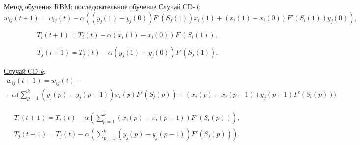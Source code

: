 \documentclass[10pt]{beamer}
\begin{document}
        \begin{frame}{Метод обучения RBM: последовательное обучение}
            \underline{Случай CD-\textit{1}}:
            \begin{equation*}
                w_{ij}(t+1)=w_{ij}(t)-\alpha((y_j(1)-y_j(0))F'(S_j(1))x_i(1)+(x_i(1)-x_i(0))F'(S_i(1))y_j(0)),
            \end{equation*}

            \begin{equation*}
                T_i(t+1)=T_i(t)-\alpha(x_i(1)-x_i(0))F'(S_i(1)),
            \end{equation*}

            \begin{equation*}
                T_j(t+1)=T_j(t)-\alpha(y_j(1)-y_j(0))F'(S_j(1)).  
            \end{equation*}
            
            \underline{Случай CD-\textit{k}}:
            \begin{multline*}
                w_{ij}(t+1)=w_{ij}(t)-\\-\alpha\Bigg(\sum_{p=1}^k (y_j(p)-y_j(p-1))x_i(p)F'(S_j(p))+(x_i(p)-x_i(p-1))y_j(p-1)F'(S_i(p))\Bigg)
            \end{multline*}

            \begin{equation*}
            \begin{aligned}
                T_i(t+1)=T_i(t)-\alpha\left(\sum_{p=1}^k (x_i(p)-x_i(p-1))F'(S_i(p))\right),\\
                T_j(t+1)=T_j(t)-\alpha\left(\sum_{p=1}^k (y_j(p)-y_j(p-1))F'(S_j(p))\right),
            \end{aligned}
            \end{equation*}
        \end{frame}


\end{document}
